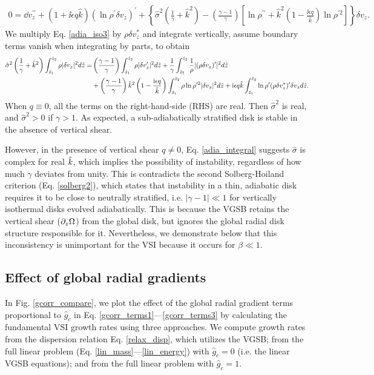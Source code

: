 \begin{align}
  0 =\dd v_z^{\prime\prime} + \left(1 + \ii \epsilon q
    \hat{k}\right)\left(\ln\rho^{\prime}\delta v_z\right)^\prime
  +\left\{\hat{\sigma}^2\left(\frac{1}{\gamma}+\hat{k}^2\right) 
    -\left(\frac{\gamma-1}{\gamma}\right)\left[\ln\rho^{\prime\prime}+\hat{k}^2\left(1-\frac{\ii\epsilon  
          q}{\hat{k}}\right)\ln\rho^{\prime 2}\right]\right\}\delta v_z.\label{adia_iso3}
\end{align}
We multiply Eq. \ref{adia_iso3} by $\rho\delta v_z^*$ and
integrate vertically, assume boundary terms vanish when integrating by
parts, to obtain
\begin{align}
  \hat{\sigma}^2\left(\frac{1}{\gamma} +
    \hat{k}^2\right)\int_{\hat{z}_1}^{\hat{z}_2}\rho|\delta
  v_z|^2 d\hat{z} 
  =&  \left(\frac{\gamma-1}{\gamma}\right)
  \int_{\hat{z}_1}^{\hat{z}_2}\rho|\delta v_z^\prime|^2 d\hat{z}
  +\frac{1}{\gamma}\int_{\hat{z}_1}^{\hat{z}_2}\frac{1}{\rho}|(\rho\delta
  v_z)^\prime|^2 d\hat{z}\notag\\
&+
  \left(\frac{\gamma-1}{\gamma}\right)\hat{k}^2\left(1-\frac{\mathrm{i}\epsilon
      q}{\hat{k}}\right) \int_{\hat{z}_1}^{\hat{z}_2}\rho\ln\rho^{\prime
    2}|\delta v_z|^2 d\hat{z}
+ \mathrm{i}\epsilon q \hat{k}
  \int_{\hat{z}_1}^{\hat{z}_2}\ln\rho^\prime(\rho\delta v_z^*)^\prime
  \delta v_z d\hat{z}.\label{adia_integral}
\end{align}
When $q\equiv0$, all the terms on the right-hand-side (RHS) are real. Then
$\hat{\sigma}^2$ is real, and  $\hat{\sigma}^2>0$ if $\gamma>1$. As
expected, a sub-adiabatically stratified disk is stable in the absence
of vertical shear. 

However, in the presence of vertical shear $q\neq0$,
Eq. \ref{adia_integral} suggests $\hat{\sigma}$ is complex for real
$\hat{k}$, which implies the possibility of instability, regardless of
how much $\gamma$ deviates from unity. This is contradicts the second 
Solberg-Hoiland criterion (Eq. \ref{solberg2}), which states that 
instability in a thin, adiabatic disk requires it to be close to 
neutrally stratified, i.e. $|\gamma-1|\ll1$ for vertically isothermal disks
evolved adiabatically. 
This is because the VGSB retains the vertical shear
($\partial_z\Omega$) from the global disk, but ignores the global radial
disk structure responsible for it. Nevertheless, we demonstrate below
that this inconsistency is unimportant for the VSI because it occurs
for $\beta\ll1$.   

\subsection{Effect of global radial gradients}
In  Fig. \ref{gcorr_compare}, we plot the effect of the global radial gradient terms
proportional to $\hat{g}_c$ in 
Eq. \ref{gcorr_terms1}---\ref{gcorr_terms3} by calculating the
fundamental VSI growth rates using three approaches. We compute growth rates from the dispersion
relation Eq. \ref{relax_disp}, which utilizes the VGSB;  from the
full linear problem (Eq. \ref{lin_mass}---\ref{lin_energy}) with
$\hat{g}_c=0$ (i.e. the linear VGSB equations); and from the full
linear problem with $\hat{g}_c=1$.  

